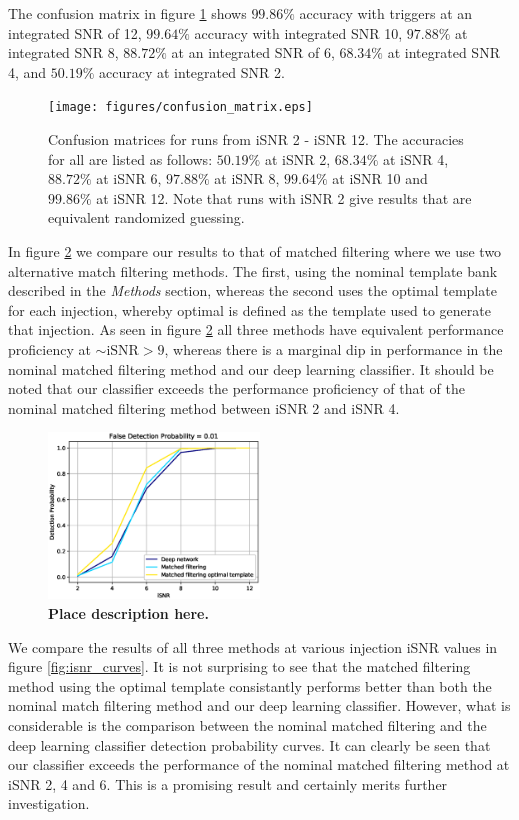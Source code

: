 \documentclass[%
 amsmath,amssymb,
 aps,
 twocolumn,
 prl,
 reprint,
floatfix,
]{revtex4-1}
\begin{document}
The confusion matrix in figure \ref{fig:confusion} shows $99.86\%$ accuracy with triggers at an integrated SNR of 12, $99.64\%$ accuracy with integrated SNR 10, $97.88\%$ at integrated SNR 8, $88.72\%$ at an integrated SNR of 6, $68.34\%$ at integrated SNR 4, and $50.19\%$ accuracy at integrated SNR 2.


\begin{figure}[]
 
 \texttt{[image: figures/confusion\_matrix.eps]}
 \caption{\label{fig:confusion} Confusion matrices for runs from iSNR 2 - iSNR 12. The accuracies for all are listed as follows: $50.19\%$ at iSNR 2, $68.34\%$ at iSNR 4, $88.72\%$ at iSNR 6, $97.88\%$ at iSNR 8, $99.64\%$ at iSNR 10 and $99.86\%$ at iSNR 12. Note that runs with iSNR 2 give results that are equivalent randomized guessing.}
\end{figure}

In figure \ref{fig:ROC_curve} we compare our results to that of matched filtering where we use two alternative match filtering methods. The first, using the nominal template bank described in the \textit{Methods} section, whereas the second uses the optimal template for each injection, whereby optimal is defined as the template used to generate that injection. As seen in figure \ref{fig:ROC_curve} all three methods have equivalent performance proficiency at $\sim \mathrm{iSNR} > 9$, whereas there is a marginal dip in performance in the nominal matched filtering method and our deep learning classifier. It should be noted that our classifier exceeds the performance proficiency of that of the nominal matched filtering method between iSNR 2 and iSNR 4. 

\begin{figure}[]
 \includegraphics[width=0.5\textwidth]
 {figures/accuracy.eps}
 \caption{\label{fig:ROC_curve} \textbf{Place description here.}}
\end{figure}

We compare the results of all three methods at various injection iSNR values in figure \ref{fig:isnr_curves}. It is not surprising to see that the matched filtering method using the optimal template consistantly performs better than both the nominal match filtering method and our deep learning classifier. However, what is considerable is the comparison between the nominal matched filtering and the deep learning classifier detection probability curves. It can clearly be seen that our classifier exceeds the performance of the nominal matched filtering method at iSNR 2, 4 and 6. This is a promising result and certainly merits further investigation.  
\end{document}
